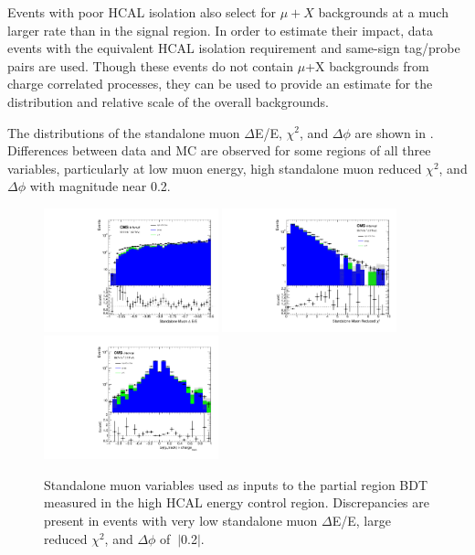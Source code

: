 Events with poor HCAL isolation also select for $\mu+X$ backgrounds at a much larger rate than in the signal region.
In order to estimate their impact, data events with the equivalent HCAL isolation requirement and same-sign tag/probe pairs are used.
Though these events do not contain $\mu$+X backgrounds from charge correlated processes, they can be used to provide an estimate for the distribution and relative scale of the overall backgrounds.

The distributions of the standalone muon $\Delta$E/E, $\chi^{2}$, and $\Delta\phi$ are shown in . 
Differences between data and MC are observed for some regions of all three variables, particularly at low muon energy, high standalone muon reduced $\chi^{2}$, and $\Delta\phi$ with magnitude near 0.2. 

\begin{figure}[htbp]
	\centering
	\includegraphics[width=0.45\textwidth]{figures/standaloneMuonValidation.pdf}
	\hspace{0.01\textwidth}
	\includegraphics[width=0.45\textwidth]{figures/standaloneMuonChiValidation.pdf}
	\vspace{0.01\textwidth}
	\includegraphics[width=0.45\textwidth]{figures/standaloneMuonPhiValidation.pdf}
        \caption[Standalone Muon Validation]{Standalone muon variables used as inputs to the partial region BDT measured in the high HCAL energy control region. Discrepancies are present in events with very low standalone muon $\Delta$E/E, large reduced $\chi^{2}$, and $\Delta\phi$ of $~|$0.2$|$.}
        \label{fig:BDTstavalid}
\end{figure}

